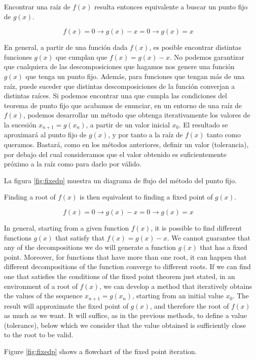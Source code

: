 \begin{paracol}{2}
Encontrar una raíz de $f(x)$ resulta entonces equivalente a buscar un punto fijo de $g(x)$. 

\begin{equation*}
f(x)=0 \rightarrow g(x)-x=0 \rightarrow g(x)=x
\end{equation*}

En general, a partir de una función dada $f(x)$, es posible encontrar distintas funciones $g(x)$ que cumplan que $f(x)=g(x)-x$. No podemos garantizar que cualquiera de las descomposiciones que hagamos nos genere una función $g(x)$ que tenga un punto fijo. 
Además, para funciones que tengan más de una raíz, puede suceder que distintas descomposiciones de la función converjan a distintas raíces.
Si podemos encontrar una que cumpla las condiciones del teorema de punto fijo que acabamos de enunciar, en un entorno de una raíz de $f(x)$, podemos desarrollar un método que obtenga iterativamente los valores de la sucesión   $x_{n+1}=g(x_n)$, a partir de un valor inicial $x_0$.  El resultado se aproximará al punto fijo de $g(x)$, y por tanto a la raíz de $f(x)$ tanto como queramos. Bastará, como   en los métodos anteriores, definir un valor (tolerancia), por debajo del cual consideramos que el valor obtenido es suficientemente próximo a  la raíz como para darlo por válido. 

La figura \ref{fig:fixedp} muestra un diagrama de flujo del método del punto fijo.
\switchcolumn


Finding a root of $f(x)$ is then equivalent to finding a fixed point of $g(x)$.

\begin{equation*}
f(x)=0 \rightarrow g(x)-x=0 \rightarrow g(x)=x
\end{equation*}

In general, starting from a given function $f(x)$, it is possible to find different functions $g(x)$ that satisfy that $f(x)=g(x)-x$. We cannot guarantee that any of the decompositions we do will generate a function $g(x)$ that has a fixed point. 
Moreover, for functions that have more than one root, it can happen that different decompositions of the function converge to different roots.
If we can find one that satisfies the conditions of the fixed point theorem just stated, in an environment of a root of $f(x)$, we can develop a method that iteratively obtains the values of the sequence $x_{n+1}=g(x_n)$, starting from an initial value $x_0$. The result will approximate the fixed point of $g(x)$, and therefore the root of $f(x)$ as much as we want. It will suffice, as in the previous methods, to define a value (tolerance), below which we consider that the value obtained is sufficiently close to the root to be valid.

Figure \ref{fig:fixedp} shows a flowchart of the fixed point iteration. 
\end{paracol}

